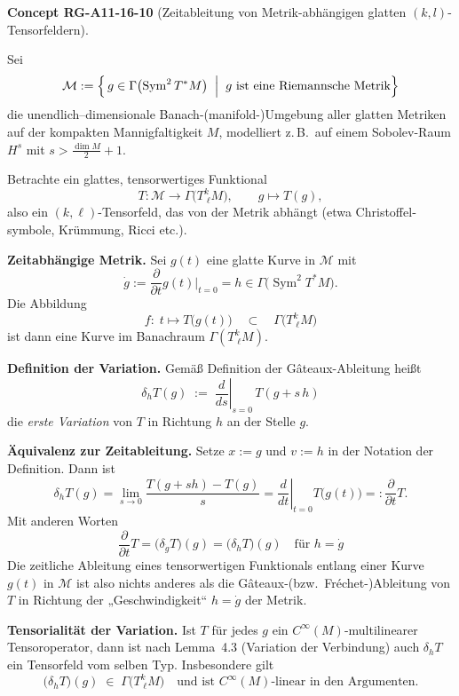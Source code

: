 \documentclass[10pt, letterpaper]{article}
\newcommand{\CustomHeading}[3]{%
  \par\medskip\noindent%
  \textbf{#1 #2} \textnormal{(#3)}.\enskip%
}
\newenvironment{CONC}[2]{\begin{unitbox}\CustomHeading{Concept}{#1}{#2}}{\end{unitbox}}
\begin{document}
\begin{CONC}{RG-A11-16-10}{Zeitableitung von Metrik-abhängigen glatten $(k,l)$-Tensorfeldern}
Sei
\[
\mathcal{M}:=\Bigl\{\,g\in\Gamma\bigl(\operatorname{Sym}^2T^{*}M\bigr)\;\Bigm|\; g\text{ ist eine Riemannsche Metrik}\Bigr\}
\]
die unendlich–dimensionale Banach-(manifold-)Umgebung aller glatten Metriken auf der kompakten Mannigfaltigkeit \(M\),
modelliert z.\,B.\ auf einem Sobolev-Raum \(H^{s}\) mit \(s>\frac{\dim M}{2}+1\).

Betrachte ein glattes, tensorwertiges Funktional
\[
T:\mathcal{M}\longrightarrow\Gamma\!\bigl(T^{k}_{\;\ell}M\bigr),
\qquad g\longmapsto T(g),
\]
also ein \((k,\ell)\)-Tensorfeld, das von der Metrik abhängt (etwa Christoffel­symbole, Krümmung, Ricci etc.).

\textbf{Zeitabhängige Metrik.}
Sei \(g(t)\) eine glatte Kurve in \(\mathcal{M}\) mit
\[
\dot g:=\frac{\partial}{\partial t}g(t)\Big|_{t=0}=h
   \in\Gamma\bigl(\operatorname{Sym}^2T^{*}M\bigr).
\]
Die Abbildung
\[
f:\;t\longmapsto T\bigl(g(t)\bigr)
\quad\subset\quad
\Gamma\!\bigl(T^{k}_{\;\ell}M\bigr)
\]
ist dann eine Kurve im Banachraum \(\Gamma(T^{k}_{\;\ell}M)\).

\textbf{Definition der Variation.}
Gemäß Definition der Gâteaux-Ableitung heißt
\[
\delta_{h}T(g)\;:=\;
\left.\frac{d}{ds}\right|_{s=0}\,T(g+s\,h)
\]
die \emph{erste Variation} von $T$ in Richtung $h$ an der Stelle $g$.

\textbf{Äquivalenz zur Zeitableitung.}
Setze $x:=g$ und $v:=h$ in der Notation der Definition.  Dann ist
\[
\delta_{h}T(g)
=\lim_{s\to0}\frac{T(g+s h)-T(g)}{s}
=\left.\frac{d}{dt}\right|_{t=0}T\!\bigl(g(t)\bigr)
=:\frac{\partial}{\partial t}T.
\]
Mit anderen Worten
\[
\boxed{\;
\frac{\partial}{\partial t}T
=
\bigl(\delta_{\dot g}T\bigr)(g)
=
\bigl(\delta_{h}T\bigr)(g)
\quad\text{für }h=\dot g
\;}
\]
Die zeitliche Ableitung eines tensorwertigen Funktionals entlang einer Kurve $g(t)$ in $\mathcal{M}$ ist also nichts anderes als die Gâteaux-(bzw.\ Fréchet-)Ableitung von $T$ in Richtung der „Geschwindigkeit“ $h=\dot g$ der Metrik.

\textbf{Tensorialität der Variation.}
Ist $T$ für jedes $g$ ein $C^{\infty}(M)$-multilinearer Tensoroperator, dann ist nach Lemma~4.3 (Variation der Verbindung) auch $\delta_{h}T$ ein Tensorfeld vom selben Typ.  Insbesondere gilt
\[
\bigl(\delta_{h}T\bigr)(g)\;\in\;\Gamma\!\bigl(T^{k}_{\;\ell}M\bigr)
\quad\text{und ist $C^{\infty}(M)$-linear in den Argumenten.}
\]
\end{CONC}
\end{document}
